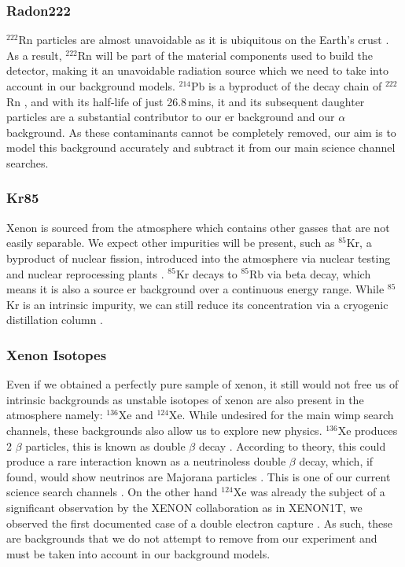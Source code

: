 \subsubsection*{Radon222}

$^{222}$Rn particles are almost unavoidable as it is ubiquitous on the Earth's crust \cite{epa_radon_origin}. As a result, $^{222}$Rn will be part of the material components used to build the detector, making it an unavoidable radiation source which we need to take into account in our background models. $^{214}$Pb is a byproduct of the decay chain of $^{222}$Rn \cite{PhysRevD.111.103040}, and with its half-life of just 26.8\,mins, it and its subsequent daughter particles are a substantial contributor to our \gls{er} background and our $\alpha$ background. As these contaminants cannot be completely removed, our aim is to model this background accurately and subtract it from our main science channel searches.

\subsubsection*{Kr85}

Xenon is sourced from the atmosphere which contains other gasses that are not easily separable. We expect other impurities will be present, such as $^{85}$Kr, a byproduct of nuclear fission, introduced into the atmosphere via nuclear testing and nuclear reprocessing plants \cite{bollhoefer2020}. $^{85}$Kr decays to $^{85}$Rb via beta decay, which means it is also a source \gls{er} background over a continuous energy range. While $^{85}$Kr is an intrinsic impurity, we can still reduce its concentration via a cryogenic distillation column \cite{Guida:2025lif}.

\subsubsection*{Xenon Isotopes}

Even if we obtained a perfectly pure sample of xenon, it still would not free us of intrinsic backgrounds as unstable isotopes of xenon are also present in the atmosphere namely: $^{136}$Xe and $^{124}$Xe. While undesired for the main \gls{wimp} search channels, these backgrounds also allow us to explore new physics. $^{136}$Xe produces 2 $\beta$ particles, this is known as double $\beta$ decay \cite{double_beta_decay, PhysRevLett.59.2020}. According to theory, this could produce a rare interaction known as a neutrinoless double $\beta$ decay, which, if found, would show neutrinos are Majorana particles \cite{PhysRev.56.1184}. This is one of our current science search channels \cite{PhysRevC.106.024328}. On the other hand $^{124}$Xe was already the subject of a significant observation by the XENON collaboration as in XENON1T, we observed the first documented case of a double electron capture \cite{doubleEcapture}. As such, these are backgrounds that we do not attempt to remove from our experiment and must be taken into account in our background models.

